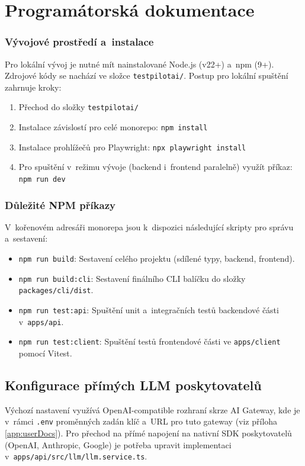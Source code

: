 \documentclass[czech, ing, kiv, he, iso690numb, viewonly]{fasthesis}
\begin{document}
\chapter{Programátorská dokumentace}\label{app:progDocs}

\subsection*{Vývojové prostředí a~instalace}
Pro lokální vývoj je nutné mít nainstalované Node.js (v22+) a~npm (9+). Zdrojové kódy se nachází ve složce \texttt{testpilotai/}.
Postup pro lokální spuštění zahrnuje kroky:
\begin{enumerate}
    \item Přechod do složky \texttt{testpilotai/}
    \item Instalace závislostí pro celé monorepo: \texttt{npm install}
    \item Instalace prohlížečů pro Playwright: \texttt{npx playwright install}
    \item Pro spuštění v~režimu vývoje (backend i~frontend paralelně) využít příkaz: \texttt{npm run dev}
\end{enumerate}

\subsection*{Důležité NPM příkazy}
V~kořenovém adresáři monorepa jsou k~dispozici následující skripty pro správu a~sestavení:
\begin{itemize}
    \item \texttt{npm run build}: Sestavení celého projektu (sdílené typy, backend, frontend).
    \item \texttt{npm run build:cli}: Sestavení finálního CLI balíčku do složky \texttt{packages/cli/dist}.
    \item \texttt{npm run test:api}: Spuštění unit a~integračních testů backendové části v~\texttt{apps/api}.
    \item \texttt{npm run test:client}: Spuštění testů frontendové části ve \texttt{apps/client} pomocí Vitest.
\end{itemize}

\newpage    
\section*{Konfigurace přímých LLM poskytovatelů}
Výchozí nastavení využívá OpenAI-compatible rozhraní skrze AI Gateway,
kde je v~rámci \texttt{.env} proměnných zadán klíč a~URL pro tuto gateway
(viz příloha \ref{app:userDocs}).
Pro přechod na přímé napojení na nativní SDK poskytovatelů (OpenAI, Anthropic, Google) 
je potřeba upravit implementaci v~\texttt{apps/api/src/llm/llm.service.ts}.
\end{document}
